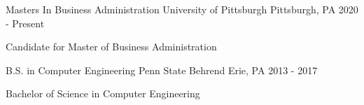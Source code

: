 


\begin{cventries}

\cventry
{Masters In Business Administration} %
{University of Pittsburgh} %
{Pittsburgh, PA} %
{2020 - Present} %
{ %
\begin{cvitems}
\item 
{
    Candidate for Master of Business Administration 
}
\end{cvitems}
}

\cventry
{B.S. in Computer Engineering} %
{Penn State Behrend} %
{Erie, PA} %
{2013 - 2017} %
{ %
\begin{cvitems}
\item 
{
    Bachelor of Science in Computer Engineering
}
\end{cvitems}
}


\end{cventries}